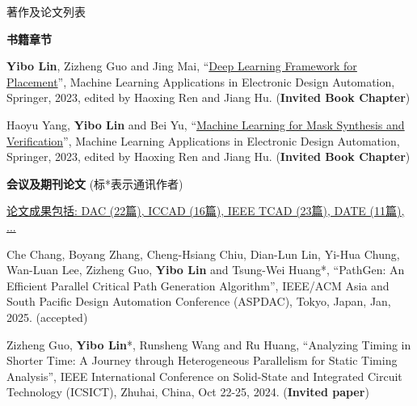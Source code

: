 \begin{rSection}{著作及论文列表}



\textbf{书籍章节}
        

\begin{description}[font=\normalfont, rightmargin=2em]
    

\item[{[B3]}]{
        \textbf{Yibo Lin}, Zizheng Guo and Jing Mai, 
    ``\href{https://doi.org/10.1007/978-3-031-13074-8}{Deep Learning Framework for Placement}'', 
    Machine Learning Applications in Electronic Design Automation, Springer, 2023, edited by Haoxing Ren and Jiang Hu.
    (\textbf{Invited Book Chapter})
}
            

\item[{[B2]}]{
        Haoyu Yang, \textbf{Yibo Lin} and Bei Yu, 
    ``\href{https://doi.org/10.1007/978-3-031-13074-8}{Machine Learning for Mask Synthesis and Verification}'', 
    Machine Learning Applications in Electronic Design Automation, Springer, 2023, edited by Haoxing Ren and Jiang Hu.
    (\textbf{Invited Book Chapter})
}
            

\end{description}
    

\textbf{会议及期刊论文} (标*表示通讯作者)
        

            \underline{论文成果包括: DAC (22篇), ICCAD (16篇), IEEE TCAD (23篇), DATE (11篇), ...} 
    

\begin{description}[font=\normalfont, rightmargin=2em]
    

\item[{[C166]}]{
        Che Chang, Boyang Zhang, Cheng-Hsiang Chiu, Dian-Lun Lin, Yi-Hua Chung, Wan-Luan Lee, Zizheng Guo, \textbf{Yibo Lin} and Tsung-Wei Huang*, 
    ``PathGen: An Efficient Parallel Critical Path Generation Algorithm'', 
    IEEE/ACM Asia and South Pacific Design Automation Conference (ASPDAC), Tokyo, Japan, Jan, 2025.
    (accepted)
}
            

\item[{[C165]}]{
        Zizheng Guo, \textbf{Yibo Lin}*, Runsheng Wang and Ru Huang, 
    ``Analyzing Timing in Shorter Time: A Journey through Heterogeneous Parallelism for Static Timing Analysis'', 
    IEEE International Conference on Solid-State and Integrated Circuit Technology (ICSICT), Zhuhai, China, Oct 22-25, 2024.
    (\textbf{Invited paper})
}
            


\end{description}
\end{rSection}
